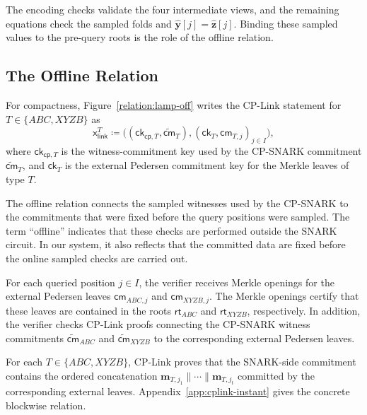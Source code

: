 \documentclass[conference,compsoc]{IEEEtran}
\newcommand{\cm}{\textsf{cm}}
\newcommand{\rt}{\textsf{rt}}
\newcommand{\ck}{\textsf{ck}}
\newcommand{\vect}{\mathbf}         %
\newcommand{\cp}{{\mathsf{cp}}}
\renewcommand{\ck}{{\textsf{ck}}}
\newcommand{\stmt}{\mathsf{x}}      %
\theoremstyle{plain}
\theoremstyle{definition}
\theoremstyle{remark}
\providecommand{\DIFaddtex}[1]{{\protect\color{DIFADD} \sf #1}} %
\providecommand{\DIFaddbegin}{} %
\providecommand{\DIFaddend}{} %
\providecommand{\DIFadd}[1]{\texorpdfstring{\DIFaddtex{#1}}{#1}} %
\providecommand{\DIFaddincludegraphics}[2][]{{\color{blue}\fbox{\DIFOincludegraphics[#1]{#2}}}} %
\DeclareRobustCommand{\DIFaddbegin}{\DIFOaddbegin \let\includegraphics\DIFaddincludegraphics} %
\DeclareRobustCommand{\DIFaddend}{\DIFOaddend \let\includegraphics\DIFOincludegraphics} %
\begin{document}
The  \DIFaddbegin \DIFadd{encoding checks validate the four intermediate views, and the remaining
equations check the sampled folds and \(\widehat{\vect{y}}[j]=
\widehat{\vect{z}}[j]\).  Binding }\DIFaddend these sampled values  \DIFaddbegin \DIFadd{to }\DIFaddend the pre-query  \DIFaddbegin \DIFadd{roots
is the role of the offline relation}\DIFaddend .

\DIFaddbegin \subsection{\DIFadd{The Offline Relation}}
\label{sec:openings-and-cplink}

\DIFaddend For compactness, Figure~\ref{relation:lamp-off} writes the CP-Link statement
for  \DIFaddbegin \DIFadd{\(T\in\{ABC,XYZB\}\) }\DIFaddend as
\[
  \stmt_{\mathsf{link}}^T
  \coloneqq
  \big(
    (\ck_{\cp,T},\widetilde{\cm}_{T}),
    (\ck_T,\cm_{T,j})_{j\in I}
  \big),
\]
where \(\ck_{\cp,T}\) is the witness-commitment key used by the CP-SNARK
commitment \(\widetilde{\cm}_{T}\), and \(\ck_T\) is the external Pedersen
commitment key for the Merkle leaves of type \(T\).

 The offline relation connects the sampled witnesses used by the
CP-SNARK to the commitments that were fixed before the query positions were
sampled.  The term ``offline'' indicates that these checks are performed outside the SNARK circuit. In our system, it also reflects that the committed data are fixed before the online sampled checks are carried out.

For each queried position \(j\in I\), the verifier receives Merkle openings for the external Pedersen leaves $\cm_{ABC,j}$ and  \DIFaddbegin \DIFadd{$\cm_{XYZB,j}$}\DIFaddend .
The Merkle openings certify that these leaves are contained in the roots
\(\rt_{ABC}\) and  \DIFaddbegin \DIFadd{\(\rt_{XYZB}\)}\DIFaddend , respectively.  In addition, the verifier checks
CP-Link proofs connecting the CP-SNARK witness commitments
\(\widetilde{\cm}_{ABC}\) and  \DIFaddbegin \DIFadd{\(\widetilde{\cm}_{XYZB}\) }\DIFaddend to the corresponding
external Pedersen leaves.

 \DIFaddbegin \DIFadd{For each \(T\in\{ABC,XYZB\}\), }\DIFaddend CP-Link  \DIFaddbegin \DIFadd{proves that }\DIFaddend the  \DIFaddbegin \DIFadd{SNARK-side commitment
contains the ordered concatenation
\(\vect{m}_{T,j_1}\|\cdots\|\vect{m}_{T,j_t}\) committed }\DIFaddend by the corresponding
external  \DIFaddbegin \DIFadd{leaves.  Appendix~\ref{app:cplink-instant} gives the concrete
blockwise relation.
}\DIFaddend 
\end{document}
